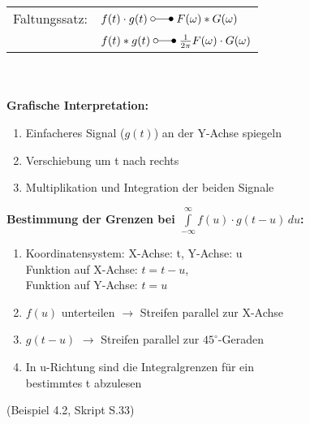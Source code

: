 	\begin{multicols}{2}
		\begin{tabular}{|l | l |}
				\hline
					Faltungssatz: & $f(t)\cdot g(t) \; \laplace \; F(\omega) \ast G(\omega)$ \\
					& $f(t) \ast g(t) \; \laplace \; \frac{1}{2\pi}F(\omega) \cdot G(\omega)$ \\
				\hline
			\end{tabular}\\ \\
		\textbf{Grafische Interpretation:}
		\begin{enumerate}
  			\item Einfacheres Signal ($g(t)$) an der Y-Achse spiegeln
  			\item Verschiebung um t nach rechts
  			\item Multiplikation und Integration der beiden Signale
		\end{enumerate}
		\columnbreak
		\textbf{Bestimmung der Grenzen bei $\int\limits_{-\infty}^\infty f(u) \cdot g(t-u)\,du$:}
		\begin{enumerate}
		  \item Koordinatensystem: X-Achse: t, Y-Achse: u\\ 
		  Funktion auf X-Achse: $t = t - u$, \\
		  Funktion auf Y-Achse: $t = u$
		  \item $f(u)$ unterteilen $\rightarrow$ Streifen parallel zur X-Achse
		  \item $g(t-u)$ $\rightarrow$ Streifen parallel zur $45^{\circ}$-Geraden
		  \item In u-Richtung sind die Integralgrenzen für ein \\ bestimmtes t abzulesen
		\end{enumerate}
	\end{multicols}
	(Beispiel 4.2, Skript S.33)
	

